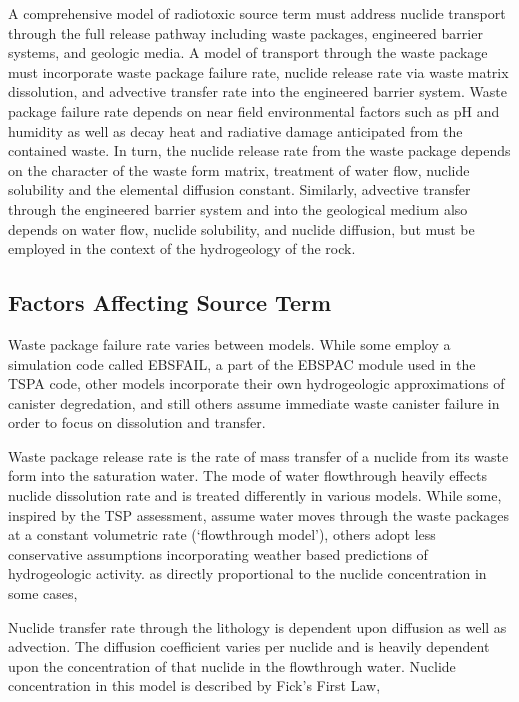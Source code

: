 A comprehensive model of radiotoxic source term must address nuclide 
transport through the full release pathway including waste packages, 
engineered barrier systems, and geologic media. A model of transport 
through the waste package must incorporate waste package failure rate, 
nuclide release rate via waste matrix dissolution, and advective 
transfer rate into the engineered barrier system.  Waste package 
failure rate depends on near field environmental factors such as pH 
and humidity as well as decay heat and radiative damage anticipated 
from the contained waste.  In turn, the nuclide release rate from the 
waste package depends on the character of the waste form matrix, 
treatment of water flow, nuclide solubility and the elemental 
diffusion constant.  Similarly, advective transfer through the 
engineered barrier system and into the geological medium also depends 
on water flow, nuclide solubility, and nuclide diffusion, but must be 
employed in the context of the hydrogeology of the rock.   

\subsection{Factors Affecting Source Term}

Waste package failure rate varies between models. While some employ a 
simulation code called EBSFAIL, a part of the EBSPAC module used in 
the TSPA code, other models incorporate their own hydrogeologic 
approximations of canister degredation, and still others assume 
immediate waste canister failure in order to focus on dissolution and 
transfer. 

Waste package release rate is the rate of mass transfer of a nuclide 
from its waste form into the saturation water.
The mode of water flowthrough heavily effects nuclide dissolution rate 
and is treated differently in various models. While some, inspired by 
the TSP assessment, assume water moves through the waste packages at a 
constant volumetric rate (`flowthrough model'), others adopt less 
conservative assumptions incorporating weather based predictions of 
hydrogeologic activity. as directly proportional to the nuclide 
concentration in some cases,  

Nuclide transfer rate through the lithology is  dependent upon 
diffusion as well as advection.  The diffusion coefficient varies per 
nuclide and is heavily dependent upon the concentration of that 
nuclide in the flowthrough water. Nuclide concentration in this model 
is described by Fick's First Law, 

